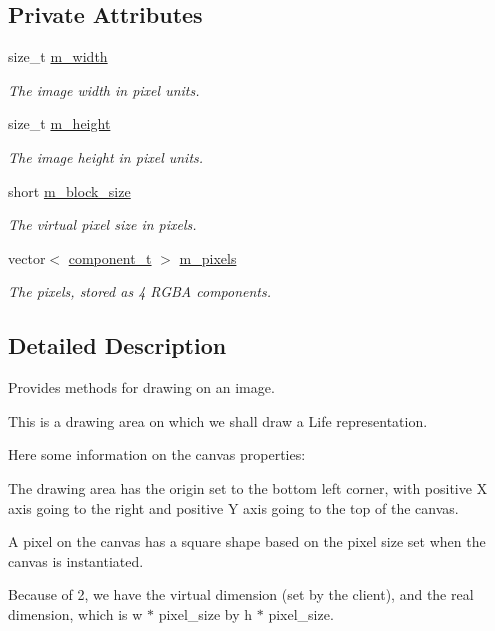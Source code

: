 \subsection*{Private Attributes}
\begin{DoxyCompactItemize}
\item 
size\+\_\+t \mbox{\hyperlink{classlife_1_1_canvas_a6bbd32c0ee090231a2052e7cd882b55c}{m\+\_\+width}}
\begin{DoxyCompactList}\small\item\em The image width in pixel units. \end{DoxyCompactList}\item 
size\+\_\+t \mbox{\hyperlink{classlife_1_1_canvas_abe558e631ac0d987ead64bb181b9c1df}{m\+\_\+height}}
\begin{DoxyCompactList}\small\item\em The image height in pixel units. \end{DoxyCompactList}\item 
short \mbox{\hyperlink{classlife_1_1_canvas_aea389d8a5d0c86654c7fb70c709dc40f}{m\+\_\+block\+\_\+size}}
\begin{DoxyCompactList}\small\item\em The virtual pixel size in pixels. \end{DoxyCompactList}\item 
vector$<$ \mbox{\hyperlink{classlife_1_1_canvas_aa0de8894cefde751c08728d25e75a911}{component\+\_\+t}} $>$ \mbox{\hyperlink{classlife_1_1_canvas_acf072584d87267af3da4c3416c93362e}{m\+\_\+pixels}}
\begin{DoxyCompactList}\small\item\em The pixels, stored as 4 R\+G\+BA components. \end{DoxyCompactList}\end{DoxyCompactItemize}


\subsection{Detailed Description}
Provides methods for drawing on an image. 

This is a drawing area on which we shall draw a Life representation.

Here some information on the canvas properties\+:


\begin{DoxyEnumerate}
\item The drawing area has the origin set to the bottom left corner, with positive {\ttfamily X} axis going to the right and positive {\ttfamily Y} axis going to the top of the canvas.
\item A pixel on the canvas has a square shape based on the pixel size set when the canvas is instantiated.
\item Because of 2, we have the {\ttfamily virtual} dimension (set by the client), and the {\ttfamily real} dimension, which is w $\ast$ pixel\+\_\+size by h $\ast$ pixel\+\_\+size.
\end{DoxyEnumerate}


